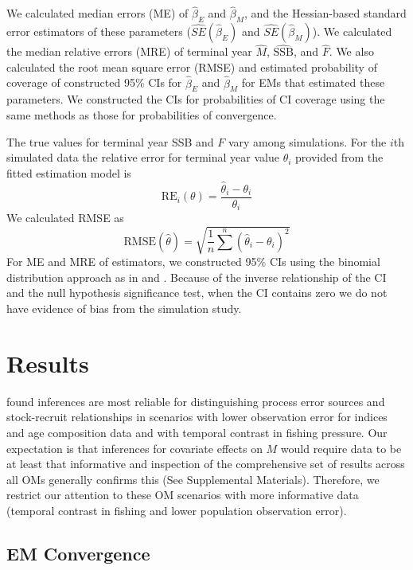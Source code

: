 \documentclass[
  12pt,
]{article}
\begin{document}
We calculated median errors (ME) of \(\widehat \beta_E\) and \(\widehat \beta_M\), and the Hessian-based standard error estimators of these parameters (\(\widehat{SE}\left(\widehat \beta_E\right)\) and \(\widehat{SE}\left(\widehat \beta_M\right)\)). We calculated the median relative errors (MRE) of terminal year \(\widehat M\), \(\widehat{\text{SSB}}\), and \(\widehat F\). We also calculated the root mean square error (RMSE) and estimated probability of coverage of constructed 95\% CIs for \(\widehat \beta_E\) and \(\widehat \beta_M\) for EMs that estimated these parameters. We constructed the CIs for probabilities of CI coverage using the same methods as those for probabilities of convergence.

The true values for terminal year SSB and \(F\) vary among simulations. For the \(i\)th simulated data the relative error for terminal year value \(\theta_i\) provided from the fitted estimation model is
\[
\text{RE}_i\left(\theta\right) = \frac{\widehat \theta_i - \theta_i}{\theta_i}
\]
We calculated RMSE as
\[
\text{RMSE}\left(\widehat \theta\right) = \sqrt{\frac{1}{n}\sum^n\left(\widehat \theta_i - \theta_i\right)^2}
\]
For ME and MRE of estimators, we constructed 95\% CIs using the binomial distribution approach as in \citet{stockmiller21} and \citet{milleretal_inreview1}. Because of the inverse relationship of the CI and the null hypothesis significance test, when the CI contains zero we do not have evidence of bias from the simulation study.

\hypertarget{results}{%
\section*{Results}\label{results}}

\citet{milleretal_inreview1} found inferences are most reliable for distinguishing process error sources and stock-recruit relationships in scenarios with lower observation error for indices and age composition data and with temporal contrast in fishing pressure. Our expectation is that inferences for covariate effects on \(M\) would require data to be at least that informative and inspection of the comprehensive set of results across all OMs generally confirms this (See Supplemental Materials). Therefore, we restrict our attention to these OM scenarios with more informative data (temporal contrast in fishing and lower population observation error).

\hypertarget{em-convergence-1}{%
\subsection*{EM Convergence}\label{em-convergence-1}}
\end{document}
